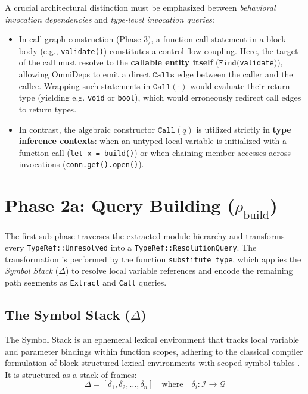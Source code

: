 A crucial architectural distinction must be emphasized between
\textit{behavioral invocation dependencies}
and \textit{type-level invocation queries}:
\begin{itemize}
  \item In call graph construction (Phase 3), a function call
    statement in a block body
    (e.g., \texttt{validate()}) constitutes a control-flow coupling.
    Here, the target of the call
    must resolve to the \textbf{callable entity itself}
    ($\texttt{Find}($\texttt{val}\-\texttt{i}\-\texttt{date}$)$),
    allowing OmniDeps to emit a direct $\texttt{Calls}$ edge between
    the caller and the callee.
    Wrapping such statements in $\texttt{Call}(\cdot)$ would evaluate
    their return type (yielding
    e.g. \texttt{void} or \texttt{bool}), which would erroneously
    redirect call edges to return types.
  \item In contrast, the algebraic constructor $\texttt{Call}(q)$ is
    utilized strictly in
    \textbf{type inference contexts}: when an untyped local variable
    is initialized with a function call
    (\texttt{let x = build()}) or when chaining member accesses
    across invocations (\texttt{conn.get().open()}).
\end{itemize}

\section{Phase 2a: Query Building ($\rho_{\text{build}}$)}
\label{sec:query_building}

The first sub-phase traverses the extracted module hierarchy and
transforms every \texttt{TypeRef::Unresolved} into a
\texttt{TypeRef::ResolutionQuery}. The transformation is performed by
the function \texttt{substitute\_type}, which applies the
\textit{Symbol Stack} ($\Delta$) to resolve local variable references
and encode the remaining path segments as \texttt{Extract} and
\texttt{Call} queries.

\subsection{The Symbol Stack ($\Delta$)}

The Symbol Stack is an ephemeral lexical environment that tracks
local variable and parameter bindings within function scopes, adhering to
the classical compiler formulation of block-structured lexical environments
with scoped symbol tables \cite{aho_compilers_2007}. It is structured as a
stack of frames:
$$\Delta = [\delta_1, \delta_2, \ldots, \delta_n] \quad \text{where}
\quad \delta_i : \mathcal{I} \to \mathcal{Q}$$

